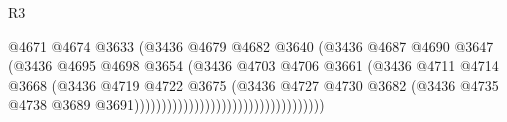 \begin{lexlean}{R3}
\begin{coremodule}
                                                          @4671
                                                          @4674
                                                          @3633
                                                          (@3436
                                                            @4679
                                                            @4682
                                                            @3640
                                                            (@3436
                                                              @4687
                                                              @4690
                                                              @3647
                                                              (@3436
                                                                @4695
                                                                @4698
                                                                @3654
                                                                (@3436
                                                                  @4703
                                                                  @4706
                                                                  @3661
                                                                  (@3436
                                                                    @4711
                                                                    @4714
                                                                    @3668
                                                                    (@3436
                                                                      @4719
                                                                      @4722
                                                                      @3675
                                                                      (@3436
                                                                        @4727
                                                                        @4730
                                                                        @3682
                                                                        (@3436
                                                                          @4735
                                                                          @4738
                                                                          @3689
                                                                          @3691)))))))))))))))))))))))))))))))))))

\end{coremodule}
\end{lexlean}
